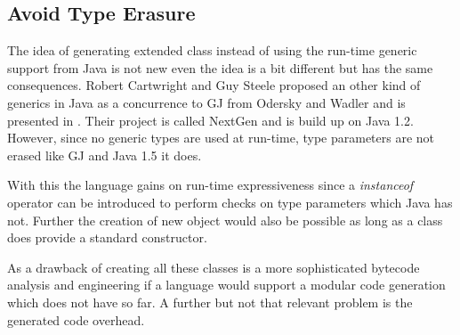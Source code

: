 \subsection{Avoid Type Erasure}
The idea of generating extended class instead of using the run-time
generic support from Java is not new even the idea is a bit different
but has the same consequences. Robert Cartwright and Guy Steele proposed
an other kind of generics in Java as a concurrence to GJ from Odersky
and Wadler and is presented in \cite{cartwright_compatible_1998}. Their
project is called NextGen and is build up on Java 1.2. However, since
no generic types are used at run-time, type parameters are not erased
like GJ and Java 1.5 it does.

With this the language gains on run-time expressiveness since a
\emph{instanceof} operator can be introduced to perform checks on type
parameters which Java has not. Further the creation of new object would
also be possible as long as a class does provide a standard constructor.

As a drawback of creating all these classes is a more sophisticated 
bytecode analysis and engineering if a language would support a modular
code generation which \ooplss does not have so far. A further but not 
that relevant problem is the generated code overhead.

%
%
%
%
%


